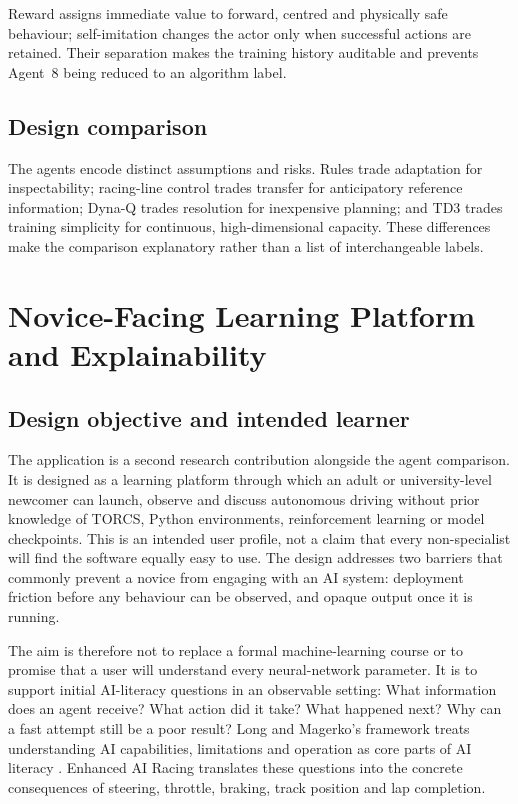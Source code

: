 Reward assigns immediate value to forward, centred and physically safe behaviour; self-imitation changes the actor only when successful actions are retained. Their separation makes the training history auditable and prevents Agent~8 being reduced to an algorithm label.

\subsection{Design comparison}

The agents encode distinct assumptions and risks. Rules trade adaptation for inspectability; racing-line control trades transfer for anticipatory reference information; Dyna-Q trades resolution for inexpensive planning; and TD3 trades training simplicity for continuous, high-dimensional capacity. These differences make the comparison explanatory rather than a list of interchangeable labels.
\section{Novice-Facing Learning Platform and Explainability}
\label{ch:telemetry-gui}

\subsection{Design objective and intended learner}

The application is a second research contribution alongside the agent comparison. It is designed as a learning platform through which an adult or university-level newcomer can launch, observe and discuss autonomous driving without prior knowledge of TORCS, Python environments, reinforcement learning or model checkpoints. This is an intended user profile, not a claim that every non-specialist will find the software equally easy to use. The design addresses two barriers that commonly prevent a novice from engaging with an AI system: deployment friction before any behaviour can be observed, and opaque output once it is running.

The aim is therefore not to replace a formal machine-learning course or to promise that a user will understand every neural-network parameter. It is to support initial AI-literacy questions in an observable setting: What information does an agent receive? What action did it take? What happened next? Why can a fast attempt still be a poor result? Long and Magerko's framework treats understanding AI capabilities, limitations and operation as core parts of AI literacy \parencite{long2020}. Enhanced AI Racing translates these questions into the concrete consequences of steering, throttle, braking, track position and lap completion.

